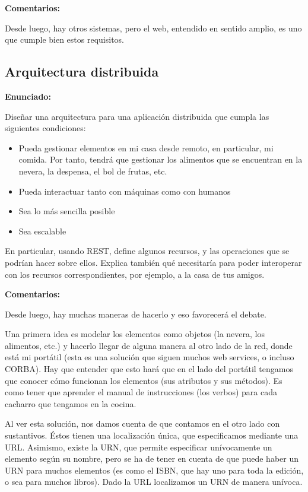 \textbf{Comentarios:}

Desde luego, hay otros sistemas, pero el web, entendido en sentido amplio, es uno que cumple bien estos requisitos.


\subsection{Arquitectura distribuida}
\label{subsec:arq-distribuida}

\textbf{Enunciado:}

Diseñar una arquitectura para una aplicación distribuida que cumpla las siguientes condiciones:

\begin{itemize}
\item Pueda gestionar elementos en mi casa desde remoto, en particular, mi comida. Por tanto, tendrá que gestionar los alimentos que se encuentran en la nevera, la despensa, el bol de frutas, etc.
\item Pueda interactuar tanto con máquinas como con humanos
\item Sea lo más sencilla posible
\item Sea escalable
\end{itemize}

En particular, usando REST, define algunos recursos, y las operaciones que se podrían hacer sobre ellos. Explica también qué necesitaría para poder interoperar con los recursos correspondientes, por ejemplo, a la casa de tus amigos.

\textbf{Comentarios:}

Desde luego, hay muchas maneras de hacerlo y eso favorecerá el debate.

Una primera idea es modelar los elementos como objetos (la nevera, los alimentos, etc.) y hacerlo llegar de alguna manera al otro lado de la red, donde está mi portátil (esta es una solución que siguen muchos web services, o incluso CORBA). Hay que entender que esto hará que en el lado del portátil tengamos que conocer cómo funcionan los elementos (sus atributos y sus métodos). Es como tener que aprender el manual de instrucciones (los verbos) para cada cacharro que tengamos en la cocina.

Al ver esta solución, nos damos cuenta de que contamos en el otro lado con sustantivos. Éstos tienen una localización única, que especificamos mediante una URL. Asimismo, existe la URN, que permite especificar unívocamente un elemento según su nombre, pero se ha de tener en cuenta de que puede haber un URN para muchos elementos (es como el ISBN, que hay uno para toda la edición, o sea para muchos libros). Dado la URL localizamos un URN de manera unívoca.

